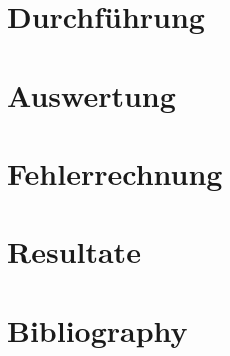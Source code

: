 \documentclass[10pt,a4paper,oneside]{article}
\begin{document}
\section{Durchführung}\label{sec:durchführung}

\clearpage

\section{Auswertung}\label{sec:auswertung}

\clearpage

\section{Fehlerrechnung}\label{sec:fehlerrechnung}

\clearpage

\section{Resultate}\label{sec:resultate}

\clearpage

%


\section{Bibliography}\label{sec:bibliography}

\clearpage

%
\end{document}
